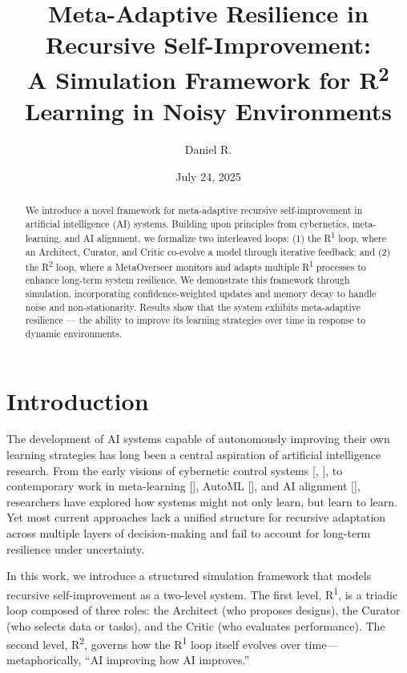 \documentclass{article}
\title{Meta-Adaptive Resilience in Recursive Self-Improvement: \\ A Simulation Framework for R\textsuperscript{2} Learning in Noisy Environments}
\author{Daniel R.} %
\date{July 24, 2025} %
\begin{document}
\maketitle

\begin{abstract}
We introduce a novel framework for meta-adaptive recursive self-improvement in artificial intelligence (AI) systems. Building upon principles from cybernetics, meta-learning, and AI alignment, we formalize two interleaved loops: (1) the R\textsuperscript{1} loop, where an Architect, Curator, and Critic co-evolve a model through iterative feedback; and (2) the R\textsuperscript{2} loop, where a MetaOverseer monitors and adapts multiple R\textsuperscript{1} processes to enhance long-term system resilience. We demonstrate this framework through simulation, incorporating confidence-weighted updates and memory decay to handle noise and non-stationarity. Results show that the system exhibits meta-adaptive resilience — the ability to improve its learning strategies over time in response to dynamic environments.
\end{abstract}

\section{Introduction}
The development of AI systems capable of autonomously improving their own learning strategies has long been a central aspiration of artificial intelligence research. From the early visions of cybernetic control systems [\cite{wiener1948cybernetics}, \cite{ashby1956ic}], to contemporary work in meta-learning [\cite{finn2017maml}], AutoML [\cite{elsken2019neural}], and AI alignment [\cite{christiano2018amplification}], researchers have explored how systems might not only learn, but learn to learn. Yet most current approaches lack a unified structure for recursive adaptation across multiple layers of decision-making and fail to account for long-term resilience under uncertainty.

In this work, we introduce a structured simulation framework that models recursive self-improvement as a two-level system. The first level, R\textsuperscript{1}, is a triadic loop composed of three roles: the Architect (who proposes designs), the Curator (who selects data or tasks), and the Critic (who evaluates performance). The second level, R\textsuperscript{2}, governs how the R\textsuperscript{1} loop itself evolves over time—metaphorically, “AI improving how AI improves.”
\end{document}
